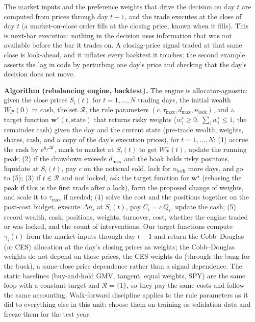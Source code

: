 \documentclass[11pt]{article}
\newcommand{\bw}{\mathbf w}
\newcommand{\Rset}{\mathcal R}
\newcommand{\WP}{W_{\mathcal P}}
\begin{document}
The market inputs and the preference weights that drive the decision on day $t$ are computed from prices through day $t-1$, and the trade executes at the close of day $t$ (a market-on-close order fills at the closing price, known when it fills). This is next-bar execution: nothing in the decision uses information that was not available before the bar it trades on. A closing-price signal traded at that same close is look-ahead, and it inflates every backtest it touches; the second example asserts the lag in code by perturbing one day's price and checking that the day's decision does not move.

\medskip\noindent\textbf{Algorithm (rebalancing engine, backtest).} The engine is allocator-agnostic: given the close prices $S_i(t)$ for $t=1,\ldots,N$ trading days, the initial wealth $\WP(0)$ in cash, the set $\Rset$, the rule parameters $(c,\tau_{\max},d_{\max},n_{\mathrm{lock}})$, and a target function $\bw^\star(t,\mathrm{state})$ that returns risky weights ($w_i^\star\ge0$, $\sum_iw_i^\star\le1$, the remainder cash) given the day and the current state (pre-trade wealth, weights, shares, cash, and a copy of the day's execution prices), for $t=1,\ldots,N$: (1) accrue the cash by $e^{g_f\Delta t}$, mark to market at $S_i(t)$ to get $W^-_{\mathcal P}(t)$, update the running peak; (2) if the drawdown exceeds $d_{\max}$ and the book holds risky positions, liquidate at $S_i(t)$, pay $c$ on the notional sold, lock for $n_{\mathrm{lock}}$ more days, and go to (5); (3) if $t\in\Rset$ and not locked, ask the target function for $\bw^\star$ (rebasing the peak if this is the first trade after a lock), form the proposed change of weights, and scale it to $\tau_{\max}$ if needed; (4) solve the cost and the positions together on the post-cost budget, execute $\Delta n_i$ at $S_i(t)$, pay $C_t=c\,Q_t$, update the cash; (5) record wealth, cash, positions, weights, turnover, cost, whether the engine traded or was locked, and the count of interventions. Our target functions compute $\gamma_i(t)$ from the market inputs through day $t-1$ and return the Cobb--Douglas (or CES) allocation at the day's closing prices as weights; the Cobb--Douglas weights do not depend on those prices, the CES weights do (through the bang for the buck), a same-close price dependence rather than a signal dependence. The static baselines (buy-and-hold GMV, tangent, equal weights, SPY) are the same loop with a constant target and $\Rset=\{1\}$, so they pay the same costs and follow the same accounting. Walk-forward discipline applies to the rule parameters as it did to everything else in this unit: choose them on training or validation data and freeze them for the test year.
\end{document}
